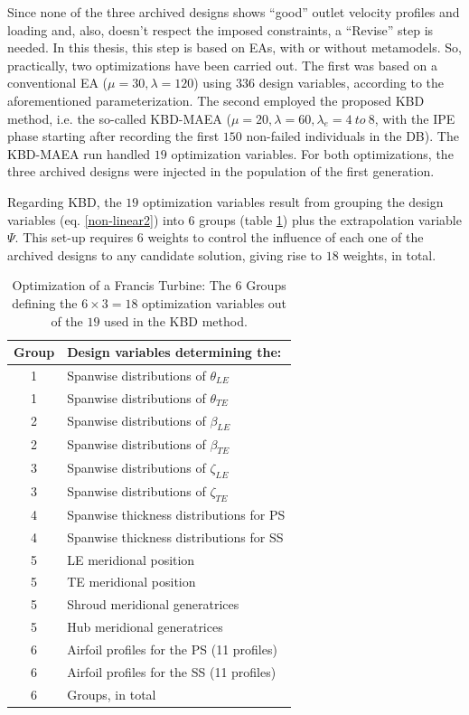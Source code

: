 Since none of the three archived designs shows ``good'' outlet velocity profiles and loading and, also, doesn't respect the imposed constraints, a ``Revise'' step is needed. In this thesis, this step is based on EAs, with or without metamodels. So, practically, two optimizations have been carried out. The first was based on a conventional EA ($\mu\!=\!30,\lambda\!=\!120$) using $336$ design variables, according to the aforementioned parameterization. The second employed the proposed KBD method, i.e. the so-called KBD-MAEA ($\mu\!=\!20,\lambda\!=\!60,\lambda_e\!=\! 4\! ~\! to\!~\! 8$, with the IPE phase starting after recording the first $150$ non-failed individuals in the DB). The KBD-MAEA run handled $19$ optimization variables. For both optimizations, the three archived designs were injected in the population of the first generation.

Regarding KBD, the $19$ optimization variables result from grouping the design variables (eq. \ref{non-linear2}) into $6$ groups (table \ref{design_groups}) plus the extrapolation variable $\Psi$. This set-up requires $6$ weights to control the influence of each one of the archived designs to any candidate solution, giving rise to $18$ weights, in total.

\begin{table}[h!]
\begin{center}
\begin{tabular}{ |c|l| }
\hline

Group              & Design variables determining the:\\
\hline
1 & Spanwise distributions of $\theta_{LE}$\\
\hline
1 & Spanwise distributions of $\theta_{TE}$\\
\hline
2 & Spanwise distributions of $\beta_{LE}$\\
\hline
2 & Spanwise distributions of $\beta_{TE}$\\
\hline
3 & Spanwise distributions of $\zeta_{LE}$\\
\hline
3 & Spanwise distributions of $\zeta_{TE}$\\
\hline
4 & Spanwise thickness distributions for PS \\
\hline
4 & Spanwise thickness distributions for SS\\
\hline
5 & LE meridional position\\
\hline
5 & TE meridional position\\
\hline
5 & Shroud meridional generatrices \\
\hline
5 & Hub meridional generatrices\\
\hline
6 & Airfoil profiles for the PS (11 profiles)\\
\hline
6 & Airfoil profiles  for the SS (11 profiles)\\
\hline
\hline
6 & Groups, in total \\
\hline   
\end{tabular}
\caption{
Optimization of a Francis Turbine: The $6$ Groups  defining the $6 \times 3=18$ optimization variables out of the $19$ used in the KBD method.}
\label{design_groups}
\end{center}
\end{table}

